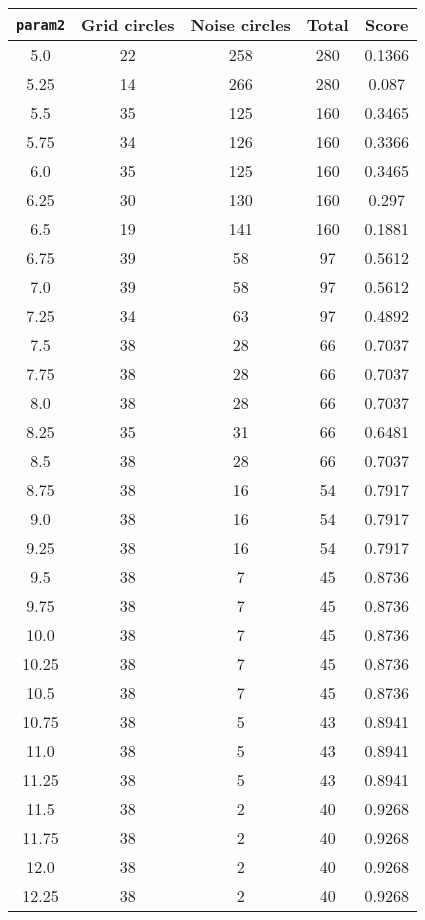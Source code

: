 \documentclass[letterpaper, 12pt]{article}
\begin{document}
\begin{longtable}{|c|c|c|c|c|}
\hline
\textbf{\texttt{param2}} & \textbf{Grid circles} & \textbf{Noise circles} & \textbf{Total} & \textbf{Score} \\
\hline
5.0 & 22 & 258 & 280 & 0.1366 \\
\hline
5.25 & 14 & 266 & 280 & 0.087 \\
\hline
5.5 & 35 & 125 & 160 & 0.3465 \\
\hline
5.75 & 34 & 126 & 160 & 0.3366 \\
\hline
6.0 & 35 & 125 & 160 & 0.3465 \\
\hline
6.25 & 30 & 130 & 160 & 0.297 \\
\hline
6.5 & 19 & 141 & 160 & 0.1881 \\
\hline
6.75 & 39 & 58 & 97 & 0.5612 \\
\hline
7.0 & 39 & 58 & 97 & 0.5612 \\
\hline
7.25 & 34 & 63 & 97 & 0.4892 \\
\hline
7.5 & 38 & 28 & 66 & 0.7037 \\
\hline
7.75 & 38 & 28 & 66 & 0.7037 \\
\hline
8.0 & 38 & 28 & 66 & 0.7037 \\
\hline
8.25 & 35 & 31 & 66 & 0.6481 \\
\hline
8.5 & 38 & 28 & 66 & 0.7037 \\
\hline
8.75 & 38 & 16 & 54 & 0.7917 \\
\hline
9.0 & 38 & 16 & 54 & 0.7917 \\
\hline
9.25 & 38 & 16 & 54 & 0.7917 \\
\hline
9.5 & 38 & 7 & 45 & 0.8736 \\
\hline
9.75 & 38 & 7 & 45 & 0.8736 \\
\hline
10.0 & 38 & 7 & 45 & 0.8736 \\
\hline
10.25 & 38 & 7 & 45 & 0.8736 \\
\hline
10.5 & 38 & 7 & 45 & 0.8736 \\
\hline
10.75 & 38 & 5 & 43 & 0.8941 \\
\hline
11.0 & 38 & 5 & 43 & 0.8941 \\
\hline
11.25 & 38 & 5 & 43 & 0.8941 \\
\hline
11.5 & 38 & 2 & 40 & 0.9268 \\
\hline
11.75 & 38 & 2 & 40 & 0.9268 \\
\hline
12.0 & 38 & 2 & 40 & 0.9268 \\
\hline
12.25 & 38 & 2 & 40 & 0.9268 \\
\hline

\end{longtable}
\end{document}
